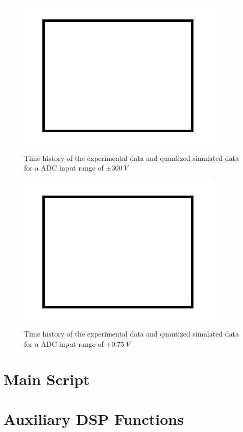 \documentclass[10pt,letterpaper,twocolumn]{article}
\begin{document}
    \begin{figure}[h]
        \centering
        \includegraphics[width=0.6\linewidth]{img/sample}
        \captionsetup{width=0.6\textwidth}
        \caption{Time history of the experimental data and quantized simulated data for a ADC input range of $\pm 300\ V$}
        \label{fig:range300}
    \end{figure}
    
    \begin{figure}[h]
        \centering
        \includegraphics[width=0.6\linewidth]{img/sample}
        \captionsetup{width=0.6\textwidth}
        \caption{Time history of the experimental data and quantized simulated data for a ADC input range of $\pm 0.75\ V$}
        \label{fig:range075}
    \end{figure}

\clearpage
\section{Main Script}
    

\clearpage
\section{Auxiliary DSP Functions}
    
\end{document}
